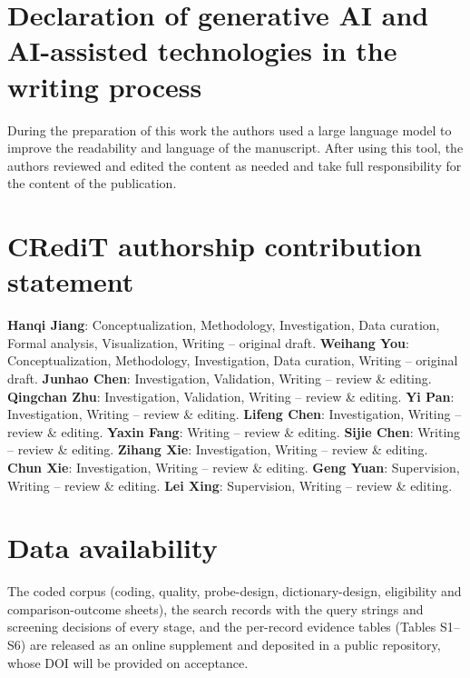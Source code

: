 \documentclass[final,3p,times,twocolumn,number,sort, compress]{elsarticle}
\begin{document}










\FloatBarrier


\section*{Declaration of generative AI and AI-assisted technologies in the writing process}
During the preparation of this work the authors used a large language model to improve the readability and language of the manuscript. After using this tool, the authors reviewed and edited the content as needed and take full responsibility for the content of the publication.

\section*{CRediT authorship contribution statement}
\textbf{Hanqi Jiang}: Conceptualization, Methodology, Investigation, Data curation, Formal analysis,
Visualization, Writing -- original draft. \textbf{Weihang You}: Conceptualization, Methodology,
Investigation, Data curation, Writing -- original draft. \textbf{Junhao Chen}: Investigation,
Validation, Writing -- review \& editing. \textbf{Qingchan Zhu}: Investigation, Validation, Writing --
review \& editing. \textbf{Yi Pan}: Investigation, Writing -- review \& editing. \textbf{Lifeng Chen}:
Investigation, Writing -- review \& editing. \textbf{Yaxin Fang}: Writing -- review \& editing.
\textbf{Sijie Chen}: Writing -- review \& editing. \textbf{Zihang Xie}:
Investigation, Writing -- review \& editing. \textbf{Chun Xie}: Investigation, Writing -- review \&
editing. \textbf{Geng Yuan}: Supervision, Writing -- review \& editing. \textbf{Lei Xing}:
Supervision, Writing -- review \& editing.

\section*{Data availability}
The coded corpus (coding, quality, probe-design, dictionary-design, eligibility and comparison-outcome sheets), the search records with the query strings and screening decisions of every stage, and the per-record evidence tables (Tables S1--S6) are released as an online supplement and deposited in a public repository, whose DOI will be provided on acceptance.
\end{document}
